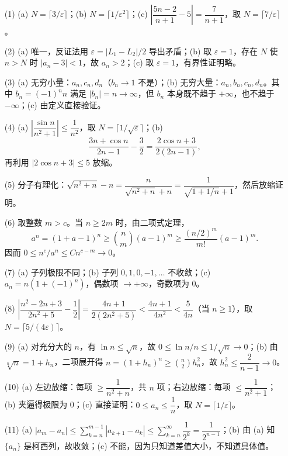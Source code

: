 \documentclass[fontset=fandol]{ctexart}
\begin{document}
\begin{enumerate}
\item[(1)] 
   (a) \(N = \lceil 3/\varepsilon \rceil\)；(b) \(N = \lceil 1/\varepsilon^2 \rceil\)；(c) \(\left|\dfrac{5n-2}{n+1} - 5\right| = \dfrac{7}{n+1}\)，取 \(N = \lceil 7/\varepsilon \rceil\)。

\item[(2)] 
   (a) 唯一，反证法用 \(\varepsilon = |L_1 - L_2|/2\) 导出矛盾；(b) 取 \(\varepsilon = 1\)，存在 \(N\) 使 \(n > N\) 时 \(|a_n-3|<1\)，故 \(a_n > 2\)；(c) 取 \(\varepsilon=1\)，有界性证明略。

\item[(3)] 
   (a) 无穷小量：\(a_n, c_n, d_n\)（\(b_n \to 1\) 不是）；(b) 无穷大量：\(a_n,b_n,c_n,d_n\)。其中 \(b_n=(-1)^n n\) 满足 \(|b_n|=n\to\infty\)，但 \(b_n\) 本身既不趋于 \(+\infty\)，也不趋于 \(-\infty\)；(c) 由定义直接验证。

\item[(4)] 
   (a) \(\left|\dfrac{\sin n}{n^2+1}\right| \leq \dfrac{1}{n^2}\)，取 \(N = \lceil 1/\sqrt{\varepsilon} \rceil\)；(b)
   \[
   \frac{3n+\cos n}{2n-1}-\frac32
   =\frac{2\cos n+3}{2(2n-1)},
   \]
   再利用 \(|2\cos n+3|\leq5\) 放缩。

\item[(5)] 
   分子有理化：\(\sqrt{n^2+n} - n = \dfrac{n}{\sqrt{n^2+n}+n} = \dfrac{1}{\sqrt{1+1/n}+1}\)，然后放缩证明。

\item[(6)] 
   取整数 \(m>c\)。当 \(n\geq2m\) 时，由二项式定理，
   \[
   a^n=(1+a-1)^n\geq\binom{n}{m}(a-1)^m
   \geq\frac{(n/2)^m}{m!}(a-1)^m.
   \]
   因而 \(0\leq n^c/a^n\leq Cn^{c-m}\to0\)。

\item[(7)] 
   (a) 子列极限不同；(b) 子列 \(0,1,0,-1,\dots\) 不收敛；(c) \(a_n = n(1+(-1)^n)\)，偶数项 \(\to +\infty\)，奇数项为 0。

\item[(8)] 
   \(\left|\dfrac{n^2-2n+3}{2n^2+5} - \dfrac{1}{2}\right| = \dfrac{4n+1}{2(2n^2+5)} < \dfrac{4n+1}{4n^2} < \dfrac{5}{4n}\)（当 \(n \geq 1\)），取 \(N = \lceil 5/(4\varepsilon) \rceil\)。

\item[(9)] 
   (a) 对充分大的 \(n\)，有 \(\ln n\leq\sqrt n\)，故 \(0\leq \ln n/n\leq1/\sqrt n\to0\)；(b) 由 \(\sqrt[n]{n}=1+h_n\)，二项展开得 \(n=(1+h_n)^n\geq\binom{n}{2}h_n^2\)，故 \(h_n^2\leq\dfrac{2}{n-1}\to0\)。

\item[(10)] 
   (a) 左边放缩：每项 \(\geq \dfrac{1}{n^2+n}\)，共 \(n\) 项；右边放缩：每项 \(\leq \dfrac{1}{n^2+1}\)；(b) 夹逼得极限为 0；(c) 直接证明：\(0 \leq a_n \leq \dfrac{1}{n}\)，取 \(N = \lceil 1/\varepsilon \rceil\)。

\item[(11)] 
   (a) \(|a_m - a_n| \leq \sum_{k=n}^{m-1} |a_{k+1}-a_k| \leq \sum_{k=n}^{\infty} \dfrac{1}{2^k} = \dfrac{1}{2^{n-1}}\)；(b) 由 (a) 知 \(\{a_n\}\) 是柯西列，故收敛；(c) 不能，因为只知道差值大小，不知道具体值。
\end{enumerate}
\fi

\clearpage
\end{document}
